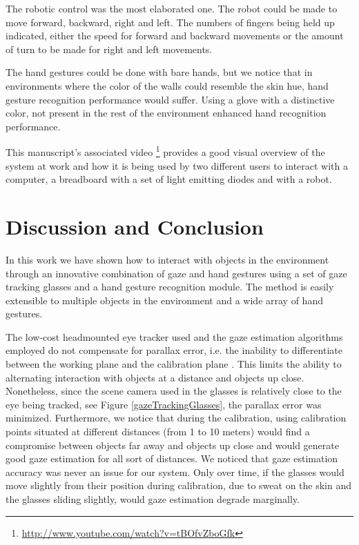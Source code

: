 \documentclass[jou,a4paper,notxfonts]{apa}
\begin{document}
The robotic control was the most elaborated one. The robot could be made to move forward, backward, right and left. The
numbers of fingers being held up indicated, either the speed for forward and backward movements or the amount of turn to
be made for right and left movements.

The hand gestures could be done with bare hands, but we notice that in environments where the color of the walls could
resemble the skin hue, hand gesture recognition performance would suffer. Using a glove with a distinctive color, not 
present in the rest of the environment enhanced hand recognition performance.

This manuscript's associated video \footnote{\url{http://www.youtube.com/watch?v=tBOfvZboGfk}} provides a good visual
overview of the system at work and how it is being used by two different users to interact with a computer, a breadboard
with a set of light emitting diodes and with a robot.


\section{Discussion and Conclusion}
In this work we have shown how to interact with objects in the environment through an innovative combination of gaze and
hand gestures using a set of gaze tracking glasses and a hand gesture recognition module. The method is easily
extensible to multiple objects in the environment and a wide array of hand gestures.

The low-cost headmounted eye tracker used and the gaze estimation algorithms employed do not compensate for parallax
error, i.e. the inability to differentiate between the working plane and the calibration plane
\cite{mardanbegi2012parallax}. This limits the ability to alternating interaction with objects at a distance and objects
up close. Nonetheless, since the scene camera used in the glasses is relatively close to the eye being tracked, see Figure
\ref{gazeTrackingGlasses}, the parallax error was minimized. Furthermore, we notice that during the calibration, using
calibration points situated at different distances (from 1 to 10 meters) would find a compromise between objects
far away and objects up close and would generate good gaze estimation for all sort of distances. We noticed that
gaze estimation accuracy was never an issue for our system. Only over time, if the glasses would move slightly from
their position during calibration, due to sweat on the skin and the glasses sliding slightly, would gaze
estimation degrade marginally.
\end{document}
